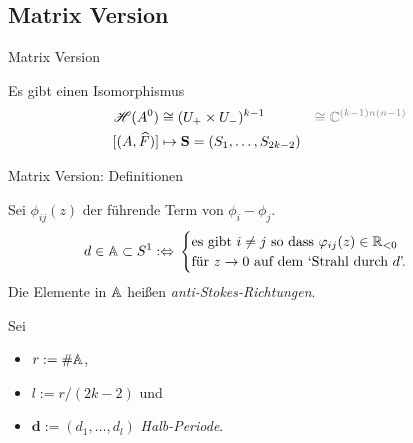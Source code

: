 \subsection{Matrix Version}
\begin{frame}{Matrix Version}
  \begin{tthm}
    Es gibt einen Isomorphismus
    \begin{align*}
      \sH(A^0)&\cong(U_+\times U_-)^{k-1}
      &\textcolor{gray}{\cong\C^{(k-1)n(n-1)}}
    \\ [(A,\hat F)]&\mapsto\textbf{S}=(S_1,\dots,S_{2k-2})
    \end{align*}
  \end{tthm}
\end{frame}
\begin{frame}[t]{Matrix Version: Definitionen}
  \begin{defn}
    Sei $\phi_{ij}(z)$ der führende Term von $\phi_i-\phi_j$.
    \begin{align*}
    d\in\mathbb{A}\subset S^1
    :\Leftrightarrow{} &
    \begin{cases}
      \text{es gibt $i\neq j$ so dass $\varphi_{ij}(z)\in\mathbb{R}_{<0}$}
    \\\text{für $z\to0$ auf dem `Strahl durch $d$'.}
    \end{cases}
    \end{align*}
    Die Elemente in $\mathbb{A}$ heißen \emph{anti-Stokes-Richtungen}.
  \end{defn}
  Sei
  \begin{itemize}
    \item $r:=\#\mathbb{A}$,
    \item $l:=r/(2k-2)$ und
    \item $\textbf{d}:=(d_1,\dots,d_l)$ \emph{Halb-Periode}.
  \end{itemize}
\end{frame}
